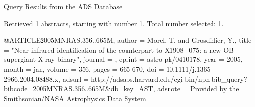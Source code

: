 Query Results from the ADS Database


Retrieved 1 abstracts, starting with number 1.  Total number selected: 1.

@ARTICLE{2005MNRAS.356..665M,
   author = {{Morel}, T. and {Grosdidier}, Y.},
    title = "{Near-infrared identification of the counterpart to X1908+075: a new OB-supergiant X-ray binary}",
  journal = {\mnras},
   eprint = {astro-ph/0410178},
     year = 2005,
    month = jan,
   volume = 356,
    pages = {665-670},
      doi = {10.1111/j.1365-2966.2004.08488.x},
   adsurl = {http://adsabs.harvard.edu/cgi-bin/nph-bib_query?bibcode=2005MNRAS.356..665M&db_key=AST},
  adsnote = {Provided by the Smithsonian/NASA Astrophysics Data System}
}


